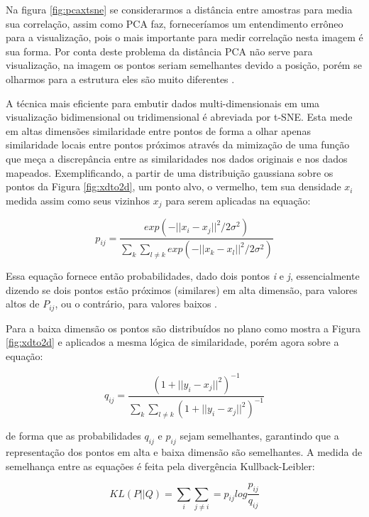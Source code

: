\documentclass[12pt]{report}
\begin{document}
Na figura \ref{fig:pcaxtsne} se considerarmos a distância entre amostras para media sua correlação, assim como PCA faz, forneceríamos um entendimento errôneo para a visualização, pois o mais importante para medir correlação nesta imagem é sua forma. Por conta deste problema da distância PCA não serve para visualização, na imagem os pontos seriam semelhantes devido a posição, porém se olharmos para a estrutura eles são muito diferentes \cite{techtalk}.

A técnica mais eficiente para embutir dados multi-dimensionais em uma visualização bidimensional ou tridimensional é abreviada por \ac{t-SNE}. Esta mede em altas dimensões similaridade entre pontos de forma a olhar apenas similaridade locais entre pontos próximos através da mimização de uma função que meça a discrepância entre as similaridades nos dados originais e nos dados mapeados. Exemplificando, a partir de uma distribuição gaussiana sobre os pontos da Figura \ref{fig:xdto2d}, um ponto alvo, o vermelho, tem sua densidade $x_i$ medida assim como seus vizinhos $x_j$ para serem aplicadas na equação:

\begin{equation}
    p_{ij} = \frac{exp(-||x_i - x_j||^2 /2\sigma^2)}{\sum_k\sum_{l\neq k}exp(-||x_k - x_l||^2/2\sigma^2)}
\end{equation}

Essa equação fornece então probabilidades, dado dois pontos \textit{i} e \textit{j}, essencialmente dizendo se dois pontos estão próximos (similares) em alta dimensão, para valores altos de $P_{ij}$, ou o contrário, para valores baixos \cite{techtalk}.

Para a baixa dimensão os pontos são distribuídos no plano como mostra a Figura \ref{fig:xdto2d} e aplicados a mesma lógica de similaridade, porém agora sobre a equação: 

\begin{equation}
    q_{ij} = \frac{(1 + ||y_i - x_j||^2)^{-1} }{\sum_k\sum_{l\neq k}(1 + ||y_i - x_j||^2)^{-1}}
\end{equation}

de forma que as probabilidades $q_{ij}$ e $p_{ij}$ sejam semelhantes, garantindo que a representação dos pontos em alta e baixa dimensão são semelhantes. A medida de semelhança entre as equações é feita pela divergência Kullback-Leibler:

\begin{equation}
    KL(P||Q) = \sum_i\sum_{j\neq i} = p_{ij}log\frac{p_{ij}}{q_{ij}}
\end{equation}
\end{document}
